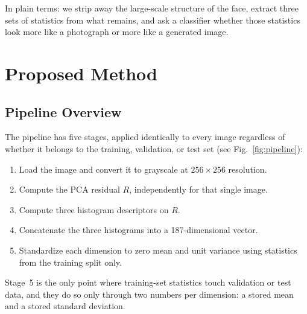 \documentclass[runningheads]{llncs}
\begin{document}
In plain terms: we strip away the large-scale structure of the face, extract three sets of statistics from what remains, and ask a classifier whether those statistics look more like a photograph or more like a generated image.


\section{Proposed Method}

\subsection{Pipeline Overview}

The pipeline has five stages, applied identically to every image regardless of whether it belongs to the training, validation, or test set (see Fig.~\ref{fig:pipeline}):
\begin{enumerate}[leftmargin=*]
    \item Load the image and convert it to grayscale at $256 \times 256$ resolution.
    \item Compute the PCA residual $R$, independently for that single image.
    \item Compute three histogram descriptors on $R$.
    \item Concatenate the three histograms into a 187-dimensional vector.
    \item Standardize each dimension to zero mean and unit variance using statistics from the training split only.
\end{enumerate}

Stage~5 is the only point where training-set statistics touch validation or test data, and they do so only through two numbers per dimension: a stored mean and a stored standard deviation.
\end{document}
